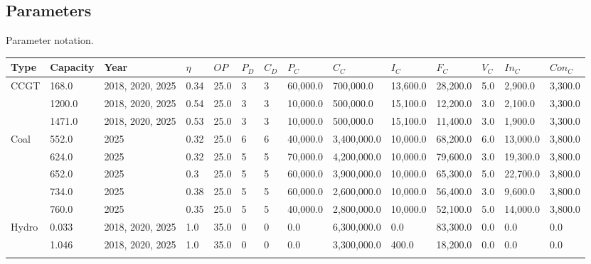 
\clearpage
\subsection{Parameters}


\begin{table}[h]
	\centering
	\caption{Parameter notation.}
\end{table}



\begin{table*}[]
	\begin{tabularx}{\linewidth}{|p{}|l|l|l|l|l|l|l|l|l|l|l|l|l|}
\hline
Type & Capacity & Year & $\eta$ & $OP$ & $P_D$ & $C_D$ & $P_C$ & $C_C$ & $I_C$ & $F_C$ & $V_C$ & $In_C$ & $Con_C$ \\ \hline
\multirow{3}{*}{CCGT} & 168.0 & 2018, 2020, 2025 & 0.34 & 25.0 & 3 & 3 & 60,000.0 & 700,000.0 & 13,600.0 & 28,200.0 & 5.0 & 2,900.0 & 3,300.0 \\ \cline{2-14} 
& 1200.0 & 2018, 2020, 2025 & 0.54 & 25.0 & 3 & 3 & 10,000.0 & 500,000.0 & 15,100.0 & 12,200.0 & 3.0 & 2,100.0 & 3,300.0 \\ \cline{2-14} 
& 1471.0 & 2018, 2020, 2025 & 0.53 & 25.0 & 3 & 3 & 10,000.0 & 500,000.0 & 15,100.0 & 11,400.0 & 3.0 & 1,900.0 & 3,300.0 \\ \hline
\multirow{5}{*}{Coal} & 552.0 & 2025 & 0.32 & 25.0 & 6 & 6 & 40,000.0 & 3,400,000.0 & 10,000.0 & 68,200.0 & 6.0 & 13,000.0 & 3,800.0 \\ \cline{2-14} 
& 624.0 & 2025 & 0.32 & 25.0 & 5 & 5 & 70,000.0 & 4,200,000.0 & 10,000.0 & 79,600.0 & 3.0 & 19,300.0 & 3,800.0 \\ \cline{2-14} 
& 652.0 & 2025 & 0.3 & 25.0 & 5 & 5 & 60,000.0 & 3,900,000.0 & 10,000.0 & 65,300.0 & 5.0 & 22,700.0 & 3,800.0 \\ \cline{2-14} 
& 734.0 & 2025 & 0.38 & 25.0 & 5 & 5 & 60,000.0 & 2,600,000.0 & 10,000.0 & 56,400.0 & 3.0 & 9,600.0 & 3,800.0 \\ \cline{2-14} 
& 760.0 & 2025 & 0.35 & 25.0 & 5 & 5 & 40,000.0 & 2,800,000.0 & 10,000.0 & 52,100.0 & 5.0 & 14,000.0 & 3,800.0 \\ \hline
\multirow{3}{*}{Hydro} & 0.033 & 2018, 2020, 2025 & 1.0 & 35.0 & 0 & 0 & 0.0 & 6,300,000.0 & 0.0 & 83,300.0 & 0.0 & 0.0 & 0.0 \\ \cline{2-14} 
& 1.046 & 2018, 2020, 2025 & 1.0 & 35.0 & 0 & 0 & 0.0 & 3,300,000.0 & 400.0 & 18,200.0 & 0.0 & 0.0 & 0.0 \\ \cline{2-14} 

\end{tabularx}
\end{table*}
